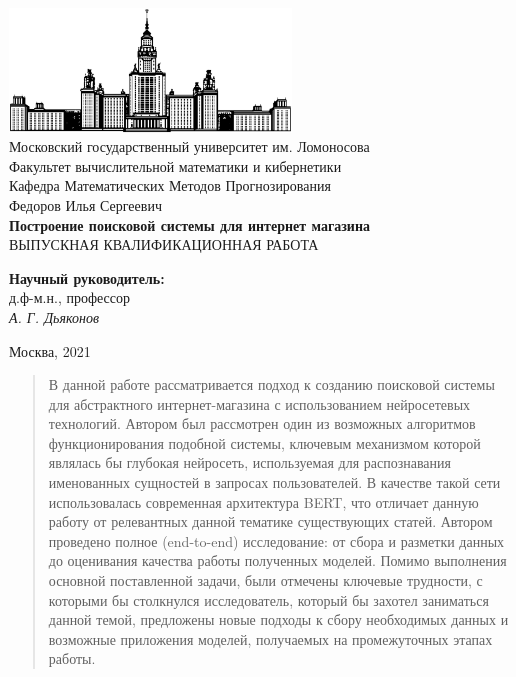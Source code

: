 \documentclass[12pt,a4paper]{article}
\begin{document}
\begin{titlepage}
\begin{center}

    \bigskip
    \includegraphics[width=75mm]{msu.eps}\\
    \bigskip
    Московский государственный университет им. Ломоносова\\
    Факультет вычислительной математики и кибернетики\\
    Кафедра Математических Методов Прогнозирования\\[10mm]
    
    Федоров Илья Сергеевич \\
    \textsf{\large\bfseries
        Построение поисковой системы для интернет магазина
    }\\[10mm]
    
    ВЫПУСКНАЯ КВАЛИФИКАЦИОННАЯ РАБОТА
    \vspace{\fill}
    \begin{flushright}
        \parbox{0.5\textwidth}{
            \textbf{Научный руководитель:}\\
            д.ф-м.н., профессор\\
            \emph{А. Г. Дьяконов}
        }
    \end{flushright}

    \vspace{\fill}
    Москва, 2021
\end{center}
\end{titlepage}

\newpage
\renewcommand{\contentsname}{Содержание}
\tableofcontents

\newpage
\begin{abstract}
В данной работе рассматривается подход к созданию поисковой системы для абстрактного интернет-магазина с использованием нейросетевых технологий. Автором был рассмотрен один из возможных алгоритмов функционирования подобной системы, ключевым механизмом которой являлась бы глубокая нейросеть, используемая для распознавания именованных сущностей в запросах пользователей. В качестве такой сети использовалась современная архитектура BERT, что отличает данную работу от релевантных данной тематике существующих статей. Автором проведено полное (end-to-end) исследование: от сбора и разметки данных до оценивания качества работы полученных моделей. Помимо выполнения основной поставленной задачи, были отмечены ключевые трудности, с которыми бы столкнулся исследователь, который бы захотел заниматься данной темой, предложены новые подходы к сбору необходимых данных и возможные приложения моделей, получаемых на промежуточных этапах работы.
\end{abstract}
\end{document}

